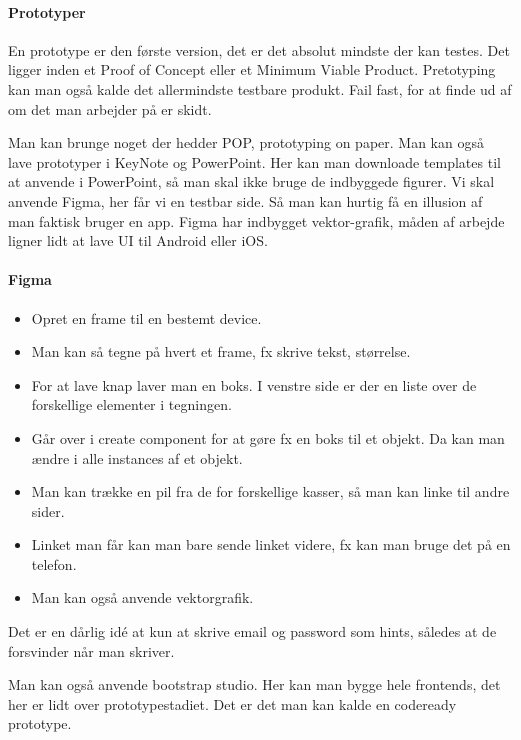 \documentclass{article}
\begin{document}
\paragraph{Prototyper}
En prototype er den første version, det er det absolut mindste der kan testes.
Det ligger inden et Proof of Concept eller et Minimum Viable Product.
Pretotyping kan man også kalde det allermindste testbare produkt. Fail fast, for
at finde ud af om det man arbejder på er skidt.

Man kan brunge noget der hedder POP, prototyping on paper. Man kan også lave
prototyper i KeyNote og PowerPoint. Her kan man downloade templates til at
anvende i PowerPoint, så man skal ikke bruge de indbyggede figurer.
Vi skal anvende Figma, her får vi en testbar side. Så man kan hurtig få en
illusion af man faktisk bruger en app. Figma har indbygget vektor-grafik, måden
af arbejde ligner lidt at lave UI til Android eller iOS.

\paragraph{Figma}
\begin{itemize}
  \item Opret en frame til en bestemt device.
  \item Man kan så tegne på hvert et frame, fx skrive tekst, størrelse.
  \item For at lave knap laver man en boks. I venstre side er der en liste over
    de forskellige elementer i tegningen.
  \item Går over i create component for at gøre fx en boks til et objekt. Da kan
    man ændre i alle instances af et objekt.
  \item Man kan trække en pil fra de for forskellige kasser, så man kan linke
    til andre sider.
  \item Linket man får kan man bare sende linket videre, fx kan man bruge det på
    en telefon.
  \item Man kan også anvende vektorgrafik.
\end{itemize}

Det er en dårlig idé at kun at skrive email og password som hints, således at de
forsvinder når man skriver.

Man kan også anvende bootstrap studio. Her kan man bygge hele frontends, det her
er lidt over prototypestadiet. Det er det man kan kalde en codeready prototype.
\end{document}
